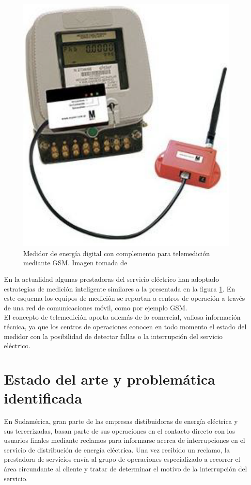 \begin{figure}
	\centering
	\includegraphics[width=0.5\linewidth]{Figures/medidor_digital_con_complemento_gsm}
	\caption{Medidor de energía digital con complemento para telemedición mediante GSM. Imagen tomada de \citep{MYEEL}}
	\label{fig:medidordigitalconcomplementogsm}
\end{figure}
En la actualidad algunas prestadoras del servicio eléctrico han adoptado estrategias de medición inteligente similares a la presentada en la figura \ref{fig:medidordigitalconcomplementogsm}. En este esquema los equipos de medición se reportan a centros de operación a través de una red de comunicaciones móvil, como por ejemplo GSM.\\
El concepto de telemedición aporta además de lo comercial, valiosa información técnica, ya que los centros de operaciones conocen en todo momento el estado del medidor con la posibilidad de detectar fallas o la interrupción del servicio eléctrico.\\  

\section{Estado del arte y problemática identificada}
En Sudamérica, gran parte de las empresas distibuidoras de energía eléctrica y sus tercerizadas, basan parte de sus operaciones en el contacto directo con los usuarios finales mediante reclamos para informarse acerca de interrupciones en el servicio de distribución de energía eléctrica. Una vez recibido un reclamo, la prestadora de servicios envía al grupo de operaciones especializado a recorrer el área circundante al cliente y tratar de determinar el motivo de la interrupción del servicio.\\

